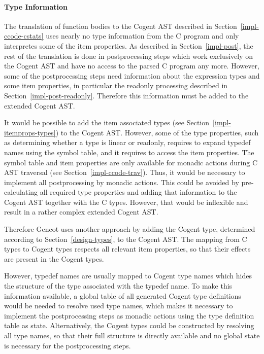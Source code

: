 \paragraph{Type Information}

The translation of function bodies to the Cogent AST described in Section~\ref{impl-ccode-cstats} uses nearly no type 
information from the C program and only interpretes some of the item properties. As described in Section~\ref{impl-post}, the
rest of the translation is done in postprocessing steps which work exclusively on the Cogent AST and have no access to
the parsed C program any more. However, some of the postprocessing steps need information about the expression types and
some item properties, in particular the readonly processing described in Section~\ref{impl-post-readonly}. Therefore
this information must be added to the extended Cogent AST.

It would be possible to add the item associated types (see Section~\ref{impl-itemprops-types}) to the Cogent AST. However, 
some of the type properties, such as determining whether a type is linear or readonly, requires to expand typedef names
using the symbol table, and it requires to access the item properties. The symbol table and item properties are only 
available for monadic actions during C AST traversal (see Section~\ref{impl-ccode-trav}). Thus, it would be necessary to
implement all postprocessing by monadic actions. This could be avoided by pre-calculating all required type properties
and adding that information to the Cogent AST together with the C types. However, that would be inflexible and result in
a rather complex extended Cogent AST.

Therefore Gencot uses another approach by adding the Cogent type, determined according to Section~\ref{design-types}, to
the Cogent AST. The mapping from C types to Cogent types respects all relevant item properties, so that their effects are
present in the Cogent types.

However, typedef names are usually mapped to Cogent type names which hides the structure of the type associated with the
typedef name. To make this information available, a global table of all generated Cogent type definitions would be needed
to resolve used type names, which makes it necessary to implement the postprocessing steps as monadic actions using the
type definition table as state. Alternatively, the Cogent types could be constructed by resolving all type names, so that
their full structure is directly available and no global state is necessary for the postprocessing steps.

